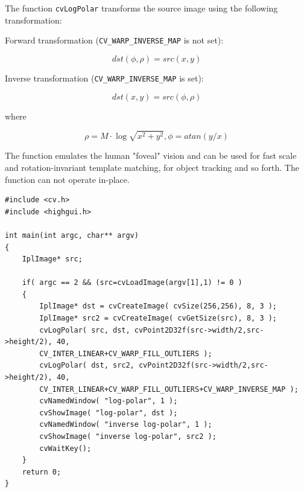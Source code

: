 \begin{description}
\end{description}

The function \texttt{cvLogPolar} transforms the source image using the following transformation:

Forward transformation (\texttt{CV\_WARP\_INVERSE\_MAP} is not set):

\[
dst(\phi,\rho) = src(x,y)
\]

Inverse transformation (\texttt{CV\_WARP\_INVERSE\_MAP} is set):

\[
dst(x,y) = src(\phi,\rho)
\]

where

\[
\rho = M \cdot \log{\sqrt{x^2 + y^2}},
\phi=atan(y/x)
\]

The function emulates the human "foveal" vision and can be used for fast scale and rotation-invariant template matching, for object tracking and so forth.
The function can not operate in-place.

\ifC
{}
\begin{lstlisting}
#include <cv.h>
#include <highgui.h>

int main(int argc, char** argv)
{
    IplImage* src;

    if( argc == 2 && (src=cvLoadImage(argv[1],1) != 0 )
    {
        IplImage* dst = cvCreateImage( cvSize(256,256), 8, 3 );
        IplImage* src2 = cvCreateImage( cvGetSize(src), 8, 3 );
        cvLogPolar( src, dst, cvPoint2D32f(src->width/2,src->height/2), 40, 
        CV_INTER_LINEAR+CV_WARP_FILL_OUTLIERS );
        cvLogPolar( dst, src2, cvPoint2D32f(src->width/2,src->height/2), 40, 
        CV_INTER_LINEAR+CV_WARP_FILL_OUTLIERS+CV_WARP_INVERSE_MAP );
        cvNamedWindow( "log-polar", 1 );
        cvShowImage( "log-polar", dst );
        cvNamedWindow( "inverse log-polar", 1 );
        cvShowImage( "inverse log-polar", src2 );
        cvWaitKey();
    }
    return 0;
}
\end{lstlisting}

